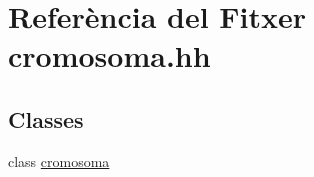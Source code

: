 \hypertarget{cromosoma_8hh}{}\section{Referència del Fitxer cromosoma.\+hh}
\label{cromosoma_8hh}
\subsection*{Classes}
\begin{DoxyCompactItemize}
\item 
class \hyperlink{classcromosoma}{cromosoma}
\end{DoxyCompactItemize}
